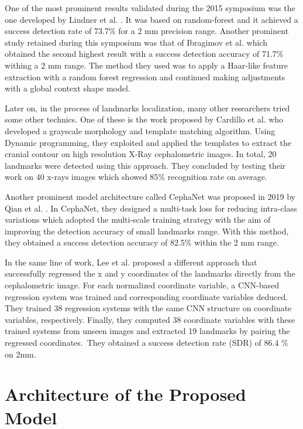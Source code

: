 \documentclass{elektr}
\begin{document}
One of the most prominent results validated during the 2015 symposium was the one developed by Lindner et al. \cite{ref3}. It was based on random-forest and it achieved a success detection rate of 73.7$\%$  for a 2 mm precision range. Another prominent study retained during this symposium was that of Ibragimov et al. \cite{ref4} which obtained the second highest result with a success detection accuracy of 71.7$\%$  withing a 2 mm range. The method they used was to apply a Haar-like feature extraction with a random forest regression and continued making adjustments with a global context shape model.

Later on, in the process of landmarks localization, many other researchers tried some other technics. One of these is the work proposed by Cardillo et al. \cite{ref5} who developed a grayscale morphology and template matching algorithm. Using Dynamic programming, they exploited and applied the templates to extract the cranial contour on high resolution X-Ray cephalometric images. In total, 20 landmarks were detected using this approach. They concluded by testing their work on 40 x-rays images which showed 85$\%$  recognition rate on average. 

Another prominent model architecture called CephaNet was proposed in 2019 by Qian et al. \cite{ref1}. In CephaNet, they designed a multi-task loss for reducing intra-class variations which adopted the multi-scale training strategy with the aim of improving the detection accuracy of small landmarks range. With this method, they obtained a success detection accuracy of 82.5$\%$  within the 2 mm range.

In the same line of work, Lee et al. \cite{ref6} proposed a different approach that successfully regressed the x and y coordinates of the landmarks directly from the cephalometric image. For each normalized coordinate variable, a CNN-based regression system was trained and corresponding coordinate variables deduced. They trained 38 regression systems with the same CNN structure on coordinate variables, respectively. Finally, they computed 38 coordinate variables with these trained systems from unseen images and extracted 19 landmarks by pairing the regressed coordinates.\ They obtained a success detection rate (SDR) of 86.4 $\%$  on 2mm.   

\section{Architecture of the Proposed Model}
\end{document}
